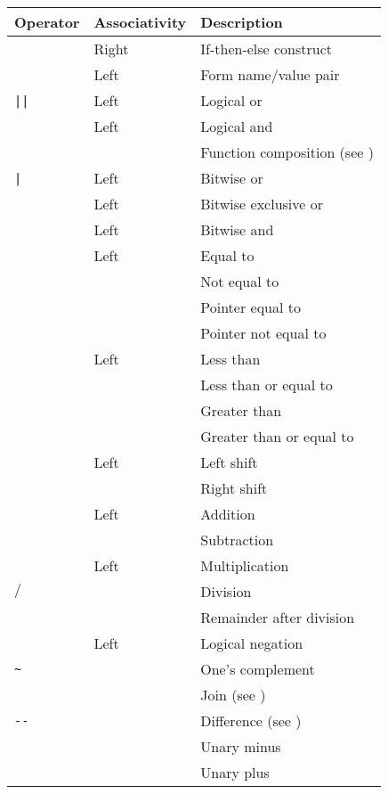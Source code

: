 \begin{tab2}
\begin{center}
\begin{tabular}{||l|l|l||}
\hline
Operator & Associativity & Description \\
\hline
\ct{if then else}	& Right			& If-then-else construct \\
\ct{=>}			& Left			& Form name/value pair \\
\verb+||+		& Left			& Logical or \\
\ct{\&\&}		& Left			& Logical and \\
\ct{@}			& 			& Function composition 
						  (see \pref{sec:func}) \\
\verb+|+		& Left			& Bitwise or \\
\rtp{}			& Left			& Bitwise exclusive or \\
\ct{\&}			& Left			& Bitwise and \\
\hline
\ct{==}			& Left			& Equal to\\
\ct{!=}			& 			& Not equal to\\
\ct{===}		& 			& Pointer equal to\\
\ct{!==}		& 			& Pointer not equal to\\
\hline
\ct{<}			& Left			& Less than \\
\ct{<=}			& 			& Less than or equal to\\
\ct{>}			& 			& Greater than \\
\ct{>=}			& 			& Greater than or equal to\\
\hline
\ct{<<}			& Left			& Left shift \\
\ct{>>}			& 			& Right shift \\
\hline
\ct{+}			& Left			& Addition \\
\ct{-}			& 			& Subtraction \\
\ct{*}			& Left			& Multiplication \\
$/$			& 			& Division \\
\ct{\%}			& 			& Remainder after division \\
\ct{!}			& Left			& Logical negation \\
\verb+~+		& 			& One's complement \\
\ct{++}			& 			& Join 
						  (see \pref{sec:listsyntax}) \\
\verb+--+		& 			& Difference 
						  (see \pref{sec:listsyntax}) \\
\ct{-}			& 			& Unary minus \\
\ct{+}			& 			& Unary plus \\

\end{tabular}
\end{center}
\end{tab2}
